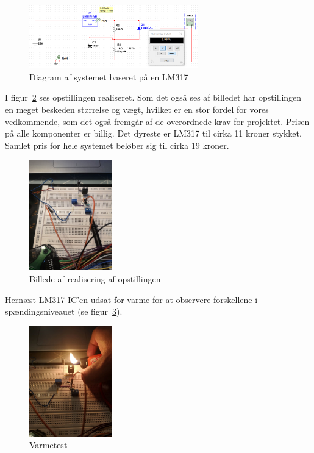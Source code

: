 \begin{figure}[h]
  \centering
  \includegraphics[width=0.65\textwidth]{srcirc.png}
  \caption{Diagram af systemet baseret på en LM317}
  \label{fig:srcirc}
\end{figure}
\clearpage
I figur~\ref{fig:srreal} ses opstillingen realiseret. Som det også ses af billedet har opstillingen en meget beskeden størrelse og vægt, hvilket er en stor fordel for vores vedkommende, som det også fremgår af de overordnede krav for projektet. Prisen på alle komponenter er billig. Det dyreste er LM317 til cirka 11 kroner stykket. Samlet pris for hele systemet beløber sig til cirka 19 kroner.

\begin{figure}[h]
  \centering
  \includegraphics[width=0.32\textwidth]{srreal.jpg}
  \caption{Billede af realisering af opstillingen}
  \label{fig:srreal}
\end{figure}

Hernæst LM317 IC’en udsat for varme for at observere forskellene i spændingsniveauet (se figur~\ref{fig:varme}).

\begin{figure}[h]
  \centering
  \includegraphics[width=0.32\textwidth]{varme.jpg}
  \caption{Varmetest}
  \label{fig:varme}
\end{figure}
\clearpage
